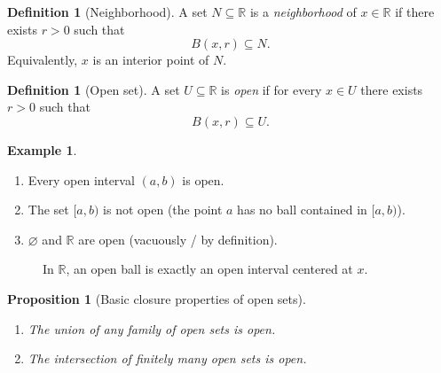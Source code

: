 \documentclass[12pt]{article}
\numberwithin{equation}{section}
\newcommand{\RR}{\mathbb{R}}
\let\emptyset\varnothing
\theoremstyle{plain}
\newtheorem{proposition}[theorem]{Proposition}
\theoremstyle{definition}
\newtheorem{definition}[theorem]{Definition}
\newtheorem{example}[theorem]{Example}
\theoremstyle{remark}
\begin{document}
\begin{definition}[Neighborhood]
A set $N\subseteq \RR$ is a \emph{neighborhood} of $x\in\RR$ if there exists $r>0$ such that
\[
B(x,r)\subseteq N.
\]
Equivalently, $x$ is an interior point of $N$.
\end{definition}

\begin{definition}[Open set]\label{def:open-set}
A set $U\subseteq \RR$ is \emph{open} if for every $x\in U$ there exists $r>0$ such that
\[
B(x,r)\subseteq U.
\]
\end{definition}

\begin{example}
\begin{enumerate}[label=(\alph*)]
\item Every open interval $(a,b)$ is open.
\item The set $[a,b)$ is not open (the point $a$ has no ball contained in $[a,b)$).
\item $\emptyset$ and $\RR$ are open (vacuously / by definition).
\end{enumerate}
\end{example}

\begin{figure}[H]
\centering
{}
\caption{In $\RR$, an open ball is exactly an open interval centered at $x$.}
\end{figure}

\begin{proposition}[Basic closure properties of open sets]\label{prop:open-ops}
\begin{enumerate}[label=(\alph*)]
\item The union of any family of open sets is open.
\item The intersection of finitely many open sets is open.
\end{enumerate}
\end{proposition}
\end{document}
